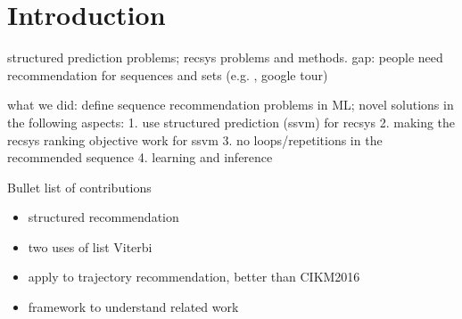 
\section{Introduction}
\label{sec:intro}

structured prediction problems;
recsys problems and methods. 
gap: 
people need recommendation for sequences and sets (e.g. \cite{chen2012playlist}, google tour)

what we did:
define sequence recommendation problems in ML; 
novel solutions in the following aspects:
1. use structured prediction (ssvm) for recsys
2. making the recsys ranking objective work for ssvm 
3. no loops/repetitions in the recommended sequence
4. learning and inference 


Bullet list of contributions
\begin{itemize}
  \item structured recommendation 
  \item two uses of list Viterbi
  \item apply to trajectory recommendation, better than CIKM2016
  \item framework to understand related work
\end{itemize}
